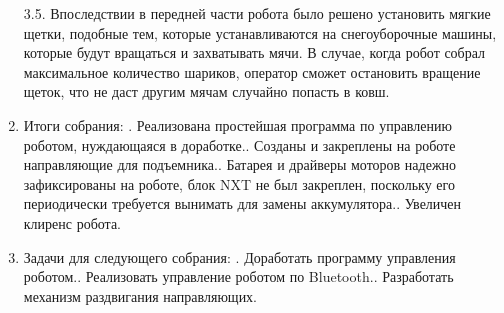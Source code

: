 \documentclass[12pt]{article}
\begin{document}
\begin{enumerate}
	      	3.5.	Впоследствии в передней части робота было решено установить мягкие щетки, подобные тем, которые устанавливаются на снегоуборочные машины, которые будут вращаться и захватывать мячи. В случае, когда робот собрал максимальное количество шариков, оператор сможет остановить вращение щеток, что не даст другим мячам случайно попасть в ковш.
	      	\item Итоги собрания:
	      	.	Реализована простейшая программа по управлению роботом, нуждающаяся в доработке..	Созданы и закреплены на роботе направляющие для подъемника..	Батарея и драйверы моторов надежно зафиксированы на роботе, блок NXT не был закреплен, поскольку его периодически требуется вынимать для замены аккумулятора..	Увеличен клиренс робота.\newline
	      	
	      	\item Задачи для следующего собрания:
	      	.	Доработать программу управления роботом..	Реализовать управление роботом по Bluetooth..	Разработать механизм раздвигания направляющих.
	      \end{enumerate}
	      \newpage
\end{document}

